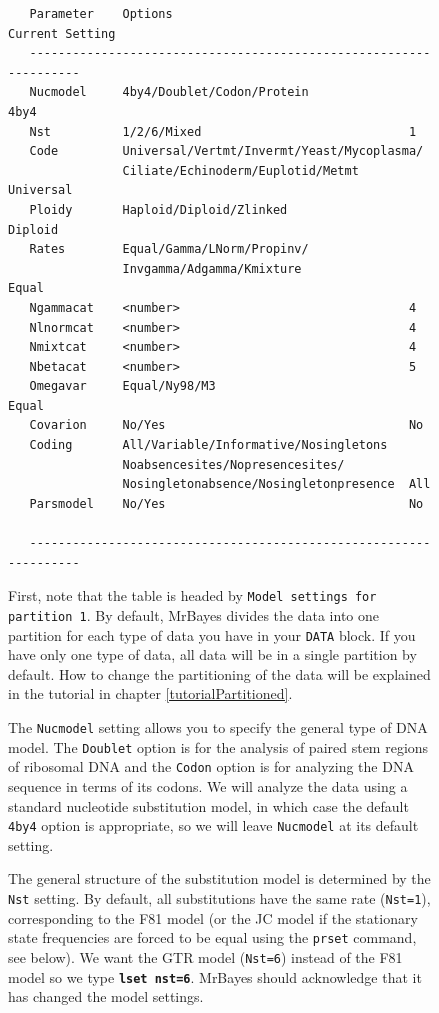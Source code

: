\documentclass[12pt]{book}
\newcommand{\ttt}[1]{\texttt{#1}}
\newcommand{\tb}[1]{\ttt{\textbf{#1}}}
\begin{document}
\begin{figure}[h]
\begin{singlespacing}
\begin{verbatim}
   Parameter    Options                               Current Setting
   ------------------------------------------------------------------
   Nucmodel     4by4/Doublet/Codon/Protein              4by4
   Nst          1/2/6/Mixed                             1
   Code         Universal/Vertmt/Invermt/Yeast/Mycoplasma/
                Ciliate/Echinoderm/Euplotid/Metmt       Universal
   Ploidy       Haploid/Diploid/Zlinked                 Diploid
   Rates        Equal/Gamma/LNorm/Propinv/
                Invgamma/Adgamma/Kmixture               Equal
   Ngammacat    <number>                                4
   Nlnormcat    <number>                                4
   Nmixtcat     <number>                                4
   Nbetacat     <number>                                5
   Omegavar     Equal/Ny98/M3                           Equal
   Covarion     No/Yes                                  No
   Coding       All/Variable/Informative/Nosingletons
                Noabsencesites/Nopresencesites/
                Nosingletonabsence/Nosingletonpresence  All
   Parsmodel    No/Yes                                  No

   ------------------------------------------------------------------
\end{verbatim}
\normalsize
\end{singlespacing}

First, note that the table is headed by \ttt{Model settings for partition 1}. By default, MrBayes
divides the data into one partition for each type of data you have in your \ttt{DATA} block. If you
have only one type of data, all data will be in a single partition by default. How to change the
partitioning of the data will be explained in the tutorial in chapter \ref{tutorialPartitioned}.

The \ttt{Nucmodel} setting allows you to specify the general type of DNA model. The \ttt{Doublet}
option is for the analysis of paired stem regions of ribosomal DNA and the \ttt{Codon} option is
for analyzing the DNA sequence in terms of its codons. We will analyze the data using a standard
nucleotide substitution model, in which case the default \ttt{4by4} option is appropriate, so we
will leave \ttt{Nucmodel} at its default setting.

The general structure of the substitution model is determined by the \ttt{Nst} setting. By default,
all substitutions have the same rate (\ttt{Nst=1}), corresponding to the F81 model (or the JC model
if the stationary state frequencies are forced to be equal using the \ttt{prset} command, see
below). We want the GTR model (\ttt{Nst=6}) instead of the F81 model so we type \tb{lset nst=6}.
MrBayes should acknowledge that it has changed the model settings.


\end{figure}
\end{document}
